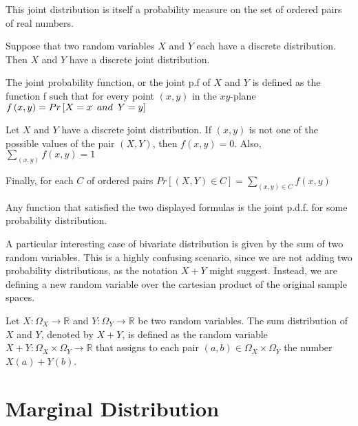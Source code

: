 {\color{red} This joint distribution is itself a probability measure on the set of ordered pairs of real numbers.}

\begin{proposition}
Suppose that two random variables $X$ and $Y$ each have a discrete distribution. Then $X$ and $Y$ have a discrete joint distribution.
\end{proposition}

\begin{definition}
The joint probability function, or the joint p.f of $X$ and $Y$ is defined as the function f such that for every point $\left(x,y\right)$ in the $xy$-plane $f\left(x,y\right)=Pr\left[X=x\enskip and\enskip Y=y\right]$
\end{definition}

\begin{proposition}
Let $X$ and $Y$ have a discrete joint distribution. If $\left(x,y\right)$ is not one of the possible values of the pair $\left(X,Y\right)$, then $f\left(x,y\right)=0$. Also, $\sum_{\left(x,y\right)}f\left(x,y\right)=1$
\end{proposition}

Finally, for each $C$ of ordered pairs $Pr\left[\left(X,Y\right)\in C\right]=\sum_{\left(x,y\right)\in C}f\left(x,y\right)$

{\color{red} Any function that satisfied the two displayed formulas is the joint p.d.f. for some probability distribution.}

A particular interesting case of bivariate distribution is given by the sum of two random variables. This is a highly confusing scenario, since we are not adding two probability distributions, as the notation $X + Y$ might suggest. Instead, we are defining a new random variable over the cartesian product of the original sample spaces.

\begin{definition}
Let $X : \Omega_X \rightarrow \mathbb{R}$ and $Y : \Omega_Y \rightarrow \mathbb{R}$ be two random variables. The sum distribution of $X$ and $Y$, denoted by $X + Y$, is defined as the random variable $X + Y : \Omega_X \times \Omega_Y \rightarrow \mathbb{R}$ that assigns to each pair $\left( a, b \right) \in \Omega_X \times \Omega_Y$ the number $X(a) + Y(b)$.
\end{definition}


\section{Marginal Distribution}

